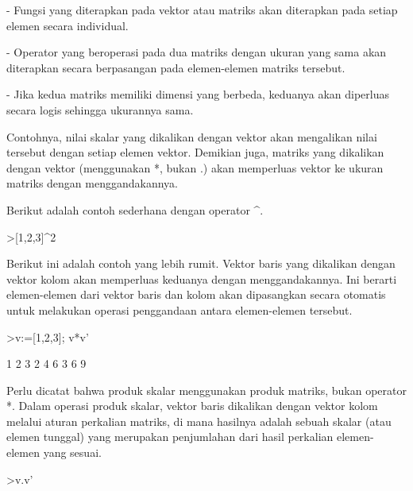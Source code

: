 \documentclass[a4paper,10pt]{article}
\begin{document}
\begin{eulernotebook}
\begin{eulercomment}
\begin{eulercomment}
\begin{eulercomment}
\begin{eulercomment}
\begin{eulercomment}
\begin{eulercomment}
\begin{eulercomment}
\begin{eulercomment}
\begin{eulercomment}
\begin{eulercomment}
\begin{eulercomment}
\begin{eulercomment}
\begin{eulercomment}
\begin{eulercomment}
\begin{eulercomment}
\begin{eulercomment}
\begin{eulercomment}
\begin{eulercomment}
\begin{eulercomment}
\begin{eulercomment}
\begin{eulercomment}
- Fungsi yang diterapkan pada vektor atau matriks akan diterapkan pada
setiap elemen secara individual.

- Operator yang beroperasi pada dua matriks dengan ukuran yang sama
akan diterapkan secara berpasangan pada elemen-elemen matriks
tersebut.

- Jika kedua matriks memiliki dimensi yang berbeda, keduanya akan
diperluas secara logis sehingga ukurannya sama.

Contohnya, nilai skalar yang dikalikan dengan vektor akan mengalikan
nilai tersebut dengan setiap elemen vektor. Demikian juga, matriks
yang dikalikan dengan vektor (menggunakan *, bukan .) akan memperluas
vektor ke ukuran matriks dengan menggandakannya.

Berikut adalah contoh sederhana dengan operator \textasciicircum{}.
\end{eulercomment}
\begin{eulerprompt}
>[1,2,3]^2
\end{eulerprompt}
\begin{euleroutput}
  [1,  4,  9]
\end{euleroutput}
\begin{eulercomment}
Berikut ini adalah contoh yang lebih rumit. Vektor baris yang
dikalikan dengan vektor kolom akan memperluas keduanya dengan
menggandakannya. Ini berarti elemen-elemen dari vektor baris dan kolom
akan dipasangkan secara otomatis untuk melakukan operasi penggandaan
antara elemen-elemen tersebut.
\end{eulercomment}
\begin{eulerprompt}
>v:=[1,2,3]; v*v'
\end{eulerprompt}
\begin{euleroutput}
              1             2             3 
              2             4             6 
              3             6             9 
\end{euleroutput}
\begin{eulercomment}
Perlu dicatat bahwa produk skalar menggunakan produk matriks, bukan
operator *. Dalam operasi produk skalar, vektor baris dikalikan dengan
vektor kolom melalui aturan perkalian matriks, di mana hasilnya adalah
sebuah skalar (atau elemen tunggal) yang merupakan penjumlahan dari
hasil perkalian elemen-elemen yang sesuai.
\end{eulercomment}
\begin{eulerprompt}
>v.v'
\end{eulerprompt}

\end{eulercomment}
\end{eulercomment}
\end{eulercomment}
\end{eulercomment}
\end{eulercomment}
\end{eulercomment}
\end{eulercomment}
\end{eulercomment}
\end{eulercomment}
\end{eulercomment}
\end{eulercomment}
\end{eulercomment}
\end{eulercomment}
\end{eulercomment}
\end{eulercomment}
\end{eulercomment}
\end{eulercomment}
\end{eulercomment}
\end{eulercomment}
\end{eulercomment}
\end{eulernotebook}
\end{document}
